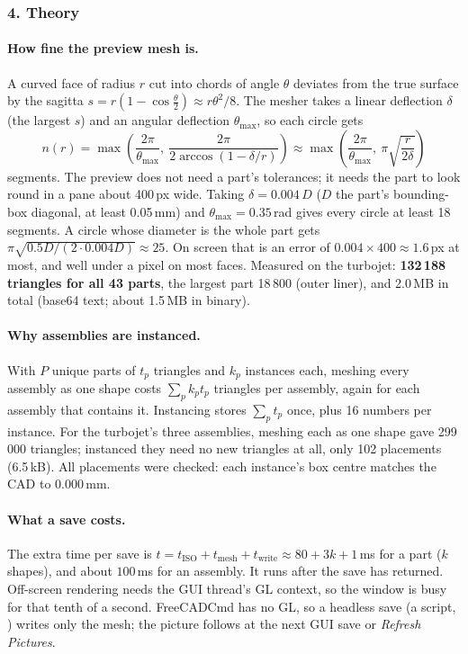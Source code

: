 \subsubsection*{4. Theory}

\paragraph{How fine the preview mesh is.} A curved face of radius $r$ cut into chords of angle $\theta$ deviates from
the true surface by the sagitta $s = r(1-\cos\tfrac{\theta}{2}) \approx r\theta^2/8$. The mesher takes a linear
deflection $\delta$ (the largest $s$) and an angular deflection $\theta_{\max}$, so each circle gets
\[
  n(r) = \max\!\left(\frac{2\pi}{\theta_{\max}},\ \frac{2\pi}{2\arccos(1-\delta/r)}\right)
       \approx \max\!\left(\frac{2\pi}{\theta_{\max}},\ \pi\sqrt{\frac{r}{2\delta}}\right)
\]
segments. The preview does not need a part's tolerances; it needs the part to look round in a pane about 400\,px
wide. Taking $\delta = 0.004\,D$ ($D$ the part's bounding-box diagonal, at least 0.05\,mm) and $\theta_{\max} =
0.35$\,rad gives every circle at least 18 segments. A circle whose diameter is the whole part gets
$\pi\sqrt{0.5D/(2 \cdot 0.004D)} \approx 25$. On screen that is an error of $0.004 \times 400 \approx 1.6$\,px at most,
and well under a pixel on most faces. Measured on the turbojet: \textbf{132\,188 triangles for all 43 parts}, the
largest part 18\,800 (outer liner), and 2.0\,MB in total (base64 text; about 1.5\,MB in binary).

\paragraph{Why assemblies are instanced.} With $P$ unique parts of $t_p$ triangles and $k_p$ instances each, meshing
every assembly as one shape costs $\sum_p k_p t_p$ triangles per assembly, again for each assembly that contains it.
Instancing stores $\sum_p t_p$ once, plus 16 numbers per instance. For the turbojet's three assemblies, meshing each as
one shape gave 299\,000 triangles; instanced they need no new triangles at all, only 102 placements (6.5\,kB). All
placements were checked: each instance's box centre matches the CAD to 0.000\,mm.

\paragraph{What a save costs.} The extra time per save is
$t = t_\text{ISO} + t_\text{mesh} + t_\text{write} \approx 80 + 3k + 1$\,ms for a part ($k$ shapes), and about
$100$\,ms for an assembly. It runs after the save has returned. Off-screen rendering needs the GUI thread's GL context,
so the window is busy for that tenth of a second. FreeCADCmd has no GL, so a headless save (a script, )
writes only the mesh; the picture follows at the next GUI save or \emph{Refresh Pictures}.

